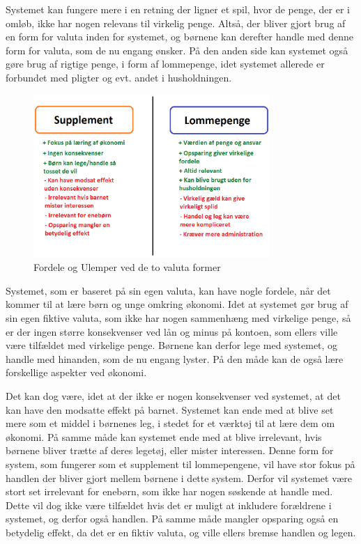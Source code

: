 Systemet kan fungere mere i en retning der ligner et spil, hvor de penge, der er i omløb, ikke har nogen relevans til virkelig penge. Altså, der bliver gjort brug af en form for valuta inden for systemet, og børnene kan derefter handle med denne form for valuta, som de nu engang ønsker. På den anden side kan systemet også gøre brug af rigtige penge, i form af lommepenge, idet systemet allerede er forbundet med pligter og evt. andet i husholdningen.

\begin{figure}[htb]
\centering
\includegraphics[width=0.8\textwidth]{Billeder/supplomme.png}
\caption{Fordele og Ulemper ved de to valuta former}
\label{SuppLomme}
\end{figure}

Systemet, som er baseret på sin egen valuta, kan have nogle fordele, når det kommer til at lære børn og unge omkring økonomi. Idet at systemet gør brug af sin egen fiktive valuta, som ikke har nogen sammenhæng med virkelige penge, så er der ingen større konsekvenser ved lån og minus på kontoen, som ellers ville være tilfældet med virkelige penge. Børnene kan derfor lege med systemet, og handle med hinanden, som de nu engang lyster. På den måde kan de også lære forskellige aspekter ved økonomi.

Det kan dog være, idet at der ikke er nogen konsekvenser ved systemet, at det kan have den modsatte effekt på barnet.  Systemet kan ende med at blive set mere som et middel i børnenes leg, i stedet for et værktøj til at lære dem om økonomi. På samme måde kan systemet ende med at blive irrelevant, hvis børnene bliver trætte af deres legetøj, eller mister interessen. Denne form for system, som fungerer som et supplement til lommepengene, vil have stor fokus på handlen der bliver gjort mellem børnene i dette system. Derfor vil systemet være stort set irrelevant for enebørn, som ikke har nogen søskende at handle med. Dette vil dog ikke være tilfældet hvis det er muligt at inkludere forældrene i systemet, og derfor også handlen. På samme måde mangler opsparing også en betydelig effekt, da det er en fiktiv valuta, og ville ellers bremse handlen og legen.
 
